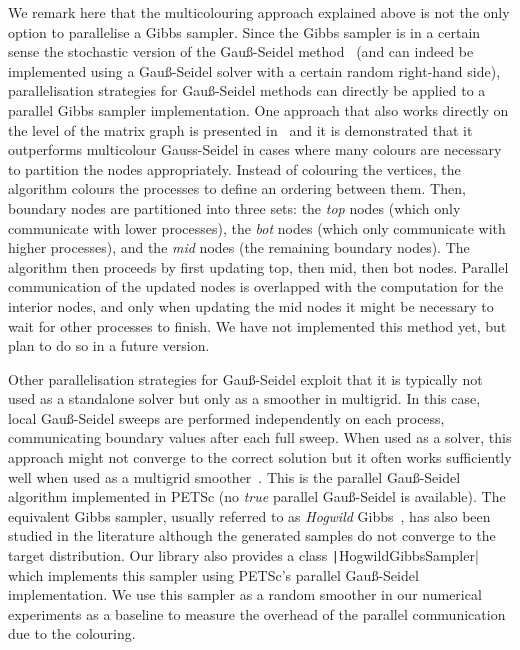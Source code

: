 \documentclass[
fontsize=11pt,
paper=a4,
numbers=noenddot
]{scrartcl}
\begin{document}
We remark here that the multicolouring approach explained above is not the only option to parallelise a Gibbs sampler. Since the Gibbs sampler is in a certain sense the stochastic version of the Gauß-Seidel method~\cite{goodmansokal,foxparker} (and can indeed be implemented using a Gauß-Seidel solver with a certain random right-hand side), parallelisation strategies for Gauß-Seidel methods can directly be applied to a parallel Gibbs sampler implementation. One approach that also works directly on the level of the matrix graph is presented in~\cite{adams2001} and it is demonstrated that it outperforms multicolour Gauss-Seidel in cases where many colours are necessary to partition the nodes appropriately. Instead of colouring the vertices, the algorithm colours the processes to define an ordering between them. Then, boundary nodes are partitioned into three sets: the \emph{top} nodes (which only communicate with lower processes), the \emph{bot} nodes (which only communicate with higher processes), and the \emph{mid} nodes (the remaining boundary nodes). The algorithm then proceeds by first updating top, then mid, then bot nodes. Parallel communication of the updated nodes is overlapped with the computation for the interior nodes, and only when updating the mid nodes it might be necessary to wait for other processes to finish. We have not implemented this method yet, but plan to do so in a future version.

Other parallelisation strategies for Gauß-Seidel exploit that it is typically not used as a standalone solver but only as a smoother in multigrid. In this case, local Gauß-Seidel sweeps are performed independently on each process, communicating boundary values after each full sweep. When used as a solver, this approach might not converge to the correct solution but it often works sufficiently well when used as a multigrid smoother~\cite{parmultigrid}. This is the parallel Gauß-Seidel algorithm implemented in PETSc (no \emph{true} parallel Gauß-Seidel is available).  The equivalent Gibbs sampler, usually referred to as \emph{Hogwild} Gibbs~\cite{hogwild}, has also been studied in the literature although the generated samples do not converge to the target distribution. Our library also provides a class  \texttt|HogwildGibbsSampler| which implements this sampler using PETSc's parallel Gauß-Seidel implementation. We use this sampler as a random smoother in our numerical experiments as a baseline to measure the overhead of the parallel communication due to the colouring.
\end{document}
